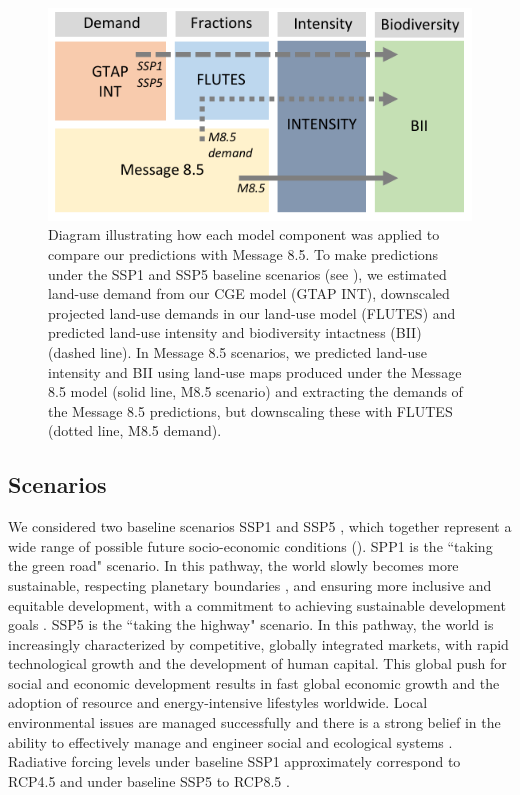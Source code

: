 \documentclass[titlesmallcaps,copyrightpage]{uomthesis}\usepackage[]{graphicx}\usepackage[]{color}
\begin{document}
\begin{figure}[htb]
  \centering
    \includegraphics{chapters/figures/chapter4/fig_comparison.pdf}
    \caption{Diagram illustrating how each model component was applied to compare our predictions with Message 8.5. To make predictions under the SSP1 and SSP5 baseline scenarios (see ), we estimated land-use demand from our CGE model (GTAP INT), downscaled projected land-use demands in our land-use model (FLUTES) and predicted land-use intensity and biodiversity intactness (BII) (dashed line). In Message 8.5 scenarios, we predicted land-use intensity and BII using land-use maps produced under the Message 8.5 model (solid line, M8.5 scenario) and extracting the demands of the Message 8.5 predictions, but downscaling these with FLUTES (dotted line, M8.5 demand).}
    \label{ch4:fig_comparison}
\end{figure}


\subsection{Scenarios}
\label{scenarios}
We considered two baseline scenarios SSP1 \citep{fricko_marker_2017} and SSP5 \citep{kriegler_fossil-fueled_2017}, which together represent a wide range of possible future socio-economic conditions (). SPP1 is the ``taking the green road" scenario. In this pathway, the world slowly becomes more sustainable, respecting planetary boundaries \citep{downing_matching_2019, marquardt_identifying_2021}, and ensuring more inclusive and equitable development, with a commitment to achieving sustainable development goals \citep{riahi_shared_2017}. SSP5 is the ``taking the highway" scenario. In this pathway, the world is increasingly characterized by competitive, globally integrated markets, with rapid technological growth and the development of human capital. This global push for social and economic development results in fast global economic growth and the adoption of resource and energy-intensive lifestyles worldwide. Local environmental issues are managed successfully and there is a strong belief in the ability to effectively manage and engineer social and ecological systems \citep{riahi_shared_2017}. Radiative forcing levels under baseline SSP1 approximately correspond to RCP4.5 and under baseline SSP5 to RCP8.5 \citep{riahi_shared_2017}.
\end{document}
